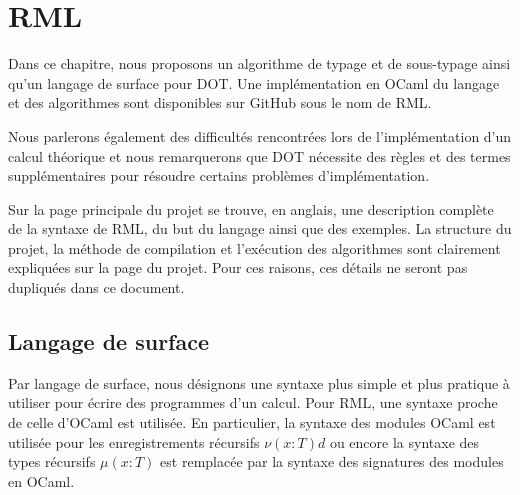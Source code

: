 \chapter{RML}
\label{chapter:rml}
\renewcommand\listingscaption{Code RML}


Dans ce chapitre, nous proposons un algorithme de typage et de sous-typage ainsi
qu'un langage de surface pour DOT. Une implémentation en OCaml du langage et des
algorithmes sont disponibles sur GitHub\cite{rml-github} sous le nom de RML.

Nous parlerons également des difficultés rencontrées lors de l'implémentation
d'un calcul théorique et nous remarquerons que DOT nécessite des règles et des termes
supplémentaires pour résoudre certains problèmes d'implémentation.


Sur la page principale du projet se trouve, en anglais, une description complète de la syntaxe de RML,
du but du langage ainsi que des exemples.
La structure du projet, la méthode de compilation et l'exécution des
algorithmes sont clairement expliquées sur la page du projet. Pour ces raisons,
ces détails ne seront pas dupliqués dans ce document.

\section{Langage de surface}

Par langage de surface, nous désignons une syntaxe plus simple et plus pratique
à utiliser pour écrire des programmes d'un calcul. Pour RML, une syntaxe proche
de celle d'OCaml est utilisée. En particulier, la syntaxe des modules OCaml est utilisée pour les
enregistrements récursifs $\nu(x : T)d$ ou encore la syntaxe des types récursifs $\mu(x :
T)$ est remplacée par la syntaxe des signatures des modules en OCaml.

